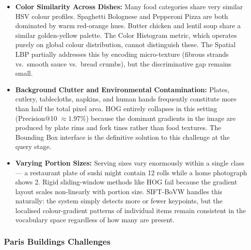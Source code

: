 \documentclass[11pt, a4paper]{article}
\begin{document}
\begin{itemize}
  \item \textbf{Color Similarity Across Dishes:} Many food categories share very similar HSV colour profiles. Spaghetti Bolognese and Pepperoni Pizza are both dominated by warm red-orange hues. Butter chicken and lentil soup share a similar golden-yellow palette. The Color Histogram metric, which operates purely on global colour distribution, cannot distinguish these. The Spatial LBP partially addresses this by encoding micro-texture (fibrous strands vs.\ smooth sauce vs.\ bread crumbs), but the discriminative gap remains small.
  \item \textbf{Background Clutter and Environmental Contamination:} Plates, cutlery, tablecloths, napkins, and human hands frequently constitute more than half the total pixel area. HOG entirely collapses in this setting (Precision@10 $\approx 1.97\%$) because the dominant gradients in the image are produced by plate rims and fork tines rather than food textures. The Bounding Box interface is the definitive solution to this challenge at the query stage.
  \item \textbf{Varying Portion Sizes:} Serving sizes vary enormously within a single class — a restaurant plate of sushi might contain 12 rolls while a home photograph shows 2. Rigid sliding-window methods like HOG fail because the gradient layout scales non-linearly with portion size. SIFT-BoVW handles this naturally: the system simply detects more or fewer keypoints, but the localised colour-gradient patterns of individual items remain consistent in the vocabulary space regardless of how many are present.
\end{itemize}

\subsubsection{Paris Buildings Challenges}
\end{document}
